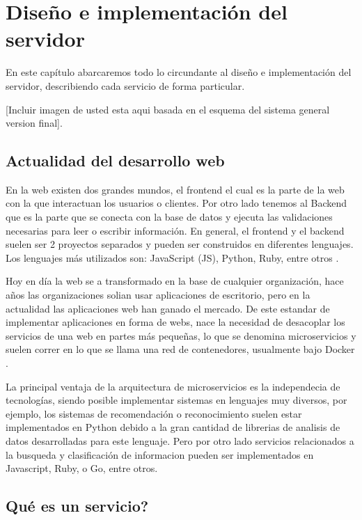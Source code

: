 \chapter{Diseño e implementación del servidor}

En este capítulo abarcaremos todo lo circundante al diseño e implementación del servidor, describiendo cada servicio de forma particular.

    [Incluir imagen de usted esta aqui basada en el esquema del sistema general version final].

\section{Actualidad del desarrollo web}

En la web existen dos grandes mundos, el frontend el cual es la parte de la web con la que interactuan los usuarios o clientes. Por otro lado tenemos al Backend que es la parte que se conecta con la base de datos y ejecuta las validaciones necesarias para leer o escribir información. En general, el frontend y el backend suelen ser 2 proyectos separados y pueden ser construidos en diferentes lenguajes. Los lenguajes más utilizados son: JavaScript (JS), Python, Ruby, entre otros \cite{presta_10_2021}.

Hoy en día la web se a transformado en la base de cualquier organización, hace años las organizaciones solian usar aplicaciones de escritorio, pero en la actualidad las aplicaciones web han ganado el mercado.
De este estandar de implementar aplicaciones en forma de webs, nace la necesidad de desacoplar los servicios de una web en partes más pequeñas, lo que se denomina microservicios y suelen correr en lo que se llama una red de contenedores, usualmente bajo Docker \cite{docker_inc_documentacion_2023}.

La principal ventaja de la arquitectura de microservicios es la independecia de tecnologías, siendo posible implementar sistemas en lenguajes muy diversos, por ejemplo, los sistemas de recomendación o reconocimiento suelen estar implementados en Python debido a la gran cantidad de librerias de analisis de datos desarrolladas para este lenguaje. Pero por otro lado servicios relacionados a la busqueda y clasificación de informacion pueden ser implementados en Javascript, Ruby, o Go, entre otros.

\section{Qué es un servicio?}

